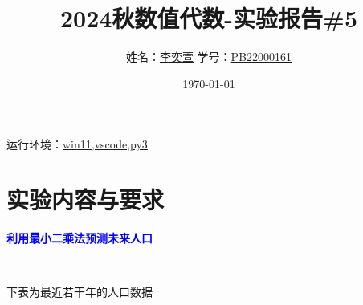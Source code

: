 \documentclass[10pt]{article}
\begin{document}
\title{\huge{\textbf{2024秋数值代数-实验报告\#5}}}
\author{姓名：\underline{李奕萱} \hspace{1cm}学号：\underline{PB22000161} }
\date{\today}

\maketitle

运行环境：\underline{win11,vscode,py3}

\section{实验内容与要求}

\textcolor{blue}{\textbf{利用最小二乘法预测未来人口}}

$ $

下表为最近若干年的人口数据
\end{document}
